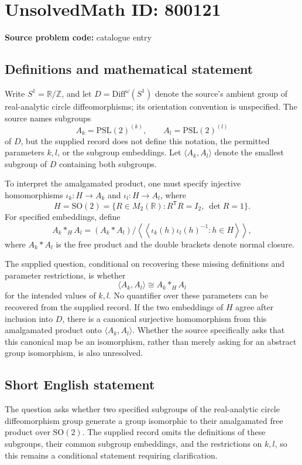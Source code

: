 \documentclass[11pt]{article}
\newcommand{\Z}{\mathbb{Z}}
\newcommand{\R}{\mathbb{R}}
\begin{document}
\section*{UnsolvedMath ID: 800121}
\textbf{Source problem code:} catalogue entry
\subsection{Definitions and mathematical statement}
Write \(S^1=\R/\Z\), and let \(D=\mathrm{Diff}^{\omega}(S^1)\) denote the source's ambient group of real-analytic circle diffeomorphisms; its orientation convention is unspecified. The source names subgroups
\[
A_k=\mathrm{PSL}(2)^{(k)},\qquad A_l=\mathrm{PSL}(2)^{(l)}
\]
of \(D\), but the supplied record does not define this notation, the permitted parameters \(k,l\), or the subgroup embeddings. Let \(\langle A_k,A_l\rangle\) denote the smallest subgroup of \(D\) containing both subgroups.

To interpret the amalgamated product, one must specify injective homomorphisms \(\iota_k:H\to A_k\) and \(\iota_l:H\to A_l\), where
\[
H=\mathrm{SO}(2)=\{R\in M_2(\R):R^{\mathsf T}R=I_2,\ \det R=1\}.
\]
For specified embeddings, define
\[
A_k*_{H}A_l
=(A_k*A_l)\big/\left\langle\!\left\langle
\iota_k(h)\iota_l(h)^{-1}:h\in H
\right\rangle\!\right\rangle,
\]
where \(A_k*A_l\) is the free product and the double brackets denote normal closure.

The supplied question, conditional on recovering these missing definitions and parameter restrictions, is whether
\[
\langle A_k,A_l\rangle\cong A_k*_{H}A_l
\]
for the intended values of \(k,l\). No quantifier over these parameters can be recovered from the supplied record. If the two embeddings of \(H\) agree after inclusion into \(D\), there is a canonical surjective homomorphism from this amalgamated product onto \(\langle A_k,A_l\rangle\). Whether the source specifically asks that this canonical map be an isomorphism, rather than merely asking for an abstract group isomorphism, is also unresolved.
\subsection{Short English statement}
The question asks whether two specified subgroups of the real-analytic circle diffeomorphism group generate a group isomorphic to their amalgamated free product over \(\mathrm{SO}(2)\). The supplied record omits the definitions of these subgroups, their common subgroup embeddings, and the restrictions on \(k,l\), so this remains a conditional statement requiring clarification.
\end{document}
